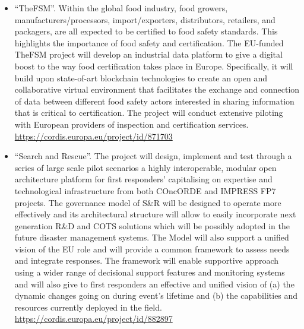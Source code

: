 \documentclass[a4paper,oneside,10pt]{article}
\begin{document}
\begin{itemize}
\item \begin{sloppypar}
``TheFSM''. Within the global food industry, food growers, manufacturers/processors, import/exporters, distributors, retailers, and packagers, are all expected to be certified to food safety standards. This highlights the importance of food safety and certification. The EU-funded TheFSM project will develop an industrial data platform to give a digital boost to the way food certification takes place in Europe. Specifically, it will build upon state-of-art blockchain technologies to create an open and collaborative virtual environment that facilitates the exchange and connection of data between different food safety actors interested in sharing information that is critical to certification. The project will conduct extensive piloting with European providers of inspection and certification services. \url{https://cordis.europa.eu/project/id/871703}

\end{sloppypar}

\item \begin{sloppypar}
``Search and Rescue''. The project will design, implement and test through a series of large scale pilot scenarios a highly interoperable, modular open architecture platform for first responders’ capitalising on expertise and technological infrastructure from both COncORDE and IMPRESS FP7 projects. The governance model of S\&R will be designed to operate more effectively and its architectural structure will allow to easily incorporate next generation R\&D and COTS solutions which will be possibly adopted in the future disaster management systems. The Model will also support a unified vision of the EU role and will provide a common framework to assess needs and integrate responses. The framework will enable supportive approach using a wider range of decisional support features and monitoring systems and will also give to first responders an effective and unified vision of (a) the dynamic changes going on during event's lifetime and (b) the capabilities and resources currently deployed in the field. \url{https://cordis.europa.eu/project/id/882897}

\end{sloppypar}


\end{itemize}
\end{document}
